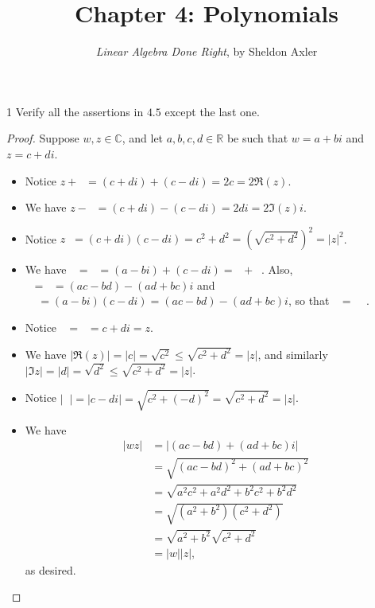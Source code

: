 \documentclass{extarticle}
\title{\vspace{-2em}Chapter 4: Polynomials}
\author{\emph{Linear Algebra Done Right}, by Sheldon Axler}
\date{}
\newenvironment{problem}[1]{\begin{prob*}{#1}{}}{\end{prob*}}
\newcommand{\R}{\mathbb{R}}
\newcommand{\C}{\mathbb{C}}
\newcommand\widebar[1]{\mathop{\overline{#1}}}
\begin{document}
\maketitle


\begin{problem}{1}
Verify all the assertions in $4.5$ except the last one.
\end{problem}
\begin{proof}
Suppose $w,z \in\C$, and let $a,b,c,d\in\R$ be such that $w = a+bi$ and $z = c + di$.
\begin{itemize}
\item Notice $z + \widebar{z} = (c + di) + (c - di) = 2c = 2\Re(z)$.
\item We have $z - \widebar{z} = (c + di) - (c - di) = 2di = 2\Im(z)i$.  
\item Notice $z\widebar{z} = (c + di)(c - di) = c^2 + d^2 = \left(\sqrt{c^2 + d^2}\right)^2 = \left |z\right |^2$.
\item We have $\widebar{w + z} = \widebar{(a + c) + (b + d)i} = (a - bi) + (c - di) = \widebar{w} + \widebar{z}$.  Also, $\widebar{wz} = \widebar{(ac - bd) + (ad + bc)i} = (ac - bd) - (ad + bc)i$ and $\widebar{w}\widebar{z} = (a-bi)(c-di) = (ac - bd)-(ad + bc)i$, so that $\widebar{wz} = \widebar{w}\widebar{z}$.
\item Notice $\widebar{\widebar{z}} = \widebar{c - di} = c + di = z$.
\item We have $\left|\Re(z)\right| = \left|c\right| = \sqrt{c^2}\leq \sqrt{c^2 + d^2} = \left|z\right|$, and similarly $\left|\Im{z}\right| = \left|d\right| = \sqrt{d^2}\leq \sqrt{c^2 + d^2} = \left|z\right|$.
\item Notice $\left|\widebar{z}\right| = \left|c - di\right| = \sqrt{c^2 + (-d)^2} = \sqrt{c^2 + d^2} = \left|z\right|$.
\item We have 
\begin{align*}
\left|wz\right| &= \left|(ac - bd) + (ad + bc)i\right|\\
&= \sqrt{(ac - bd)^2 + (ad + bc)^2}\\
&= \sqrt{a^2c^2 + a^2d^2 +b^2c^2 + b^2d^2}\\
&= \sqrt{(a^2 + b^2)(c^2 + d^2)}\\
&= \sqrt{a^2 + b^2}\sqrt{c^2 + d^2}\\
&= \left|w\right|\left| z\right|,
\end{align*}
as desired. \qedhere
\end{itemize}
\end{proof}
\end{document}
